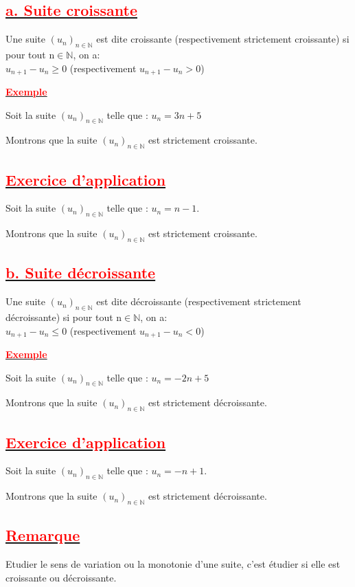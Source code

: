 \documentclass[12pt]{article}
\begin{document}
\subsection*{\underline{\textbf{\textcolor{red}{a. Suite croissante}}}}
Une suite $(u_{n})_{n\in\mathbb{N}}$ est dite croissante (respectivement strictement croissante) si pour tout n$\in\mathbb{N}$, on a:\\  $u_{n+1}-u_{n}\geq 0$ (respectivement $u_{n+1}-u_{n}> 0$)

\underline{\textbf{\textcolor{red}{Exemple}}}

Soit la suite $(u_{n})_{n\in\mathbb{N}}$ telle que : $u_{n}=3n+5$ 

Montrons que la suite $(u_{n})_{n\in\mathbb{N}}$ est strictement croissante.
\subsection*{\underline{\textbf{\textcolor{red}{Exercice d'application}}}}
Soit la suite $ (u_{n})_{n\in\mathbb{N}} $ telle que : $u_{n}=n - 1$. 

Montrons que la suite $(u_{n})_{n\in\mathbb{N}}$
est strictement croissante.
\subsection*{\underline{\textbf{\textcolor{red}{b. Suite décroissante}}}}
Une suite $(u_{n})_{n\in\mathbb{N}}$ est dite décroissante (respectivement strictement décroissante) si pour tout n$\in\mathbb{N}$, on a:\\  $u_{n+1}-u_{n}\leq 0$ (respectivement $u_{n+1}-u_{n}<0$)

\underline{\textbf{\textcolor{red}{Exemple}}}

Soit la suite $(u_{n})_{n\in\mathbb{N}}$ telle que : $u_{n}=-2n+5$ 

Montrons que la suite $(u_{n})_{n\in\mathbb{N}}$ est strictement décroissante.
\subsection*{\underline{\textbf{\textcolor{red}{Exercice d'application}}}}
Soit la suite $ (u_{n})_{n\in\mathbb{N}} $ telle que : $u_{n}=-n + 1$. 

Montrons que la suite $(u_{n})_{n\in\mathbb{N}}$
est strictement décroissante.
\subsection*{\underline{\textbf{\textcolor{red}{Remarque}}}}
Etudier le sens de variation ou la monotonie d’une suite, c’est étudier si elle est croissante
ou décroissante.
\end{document}
